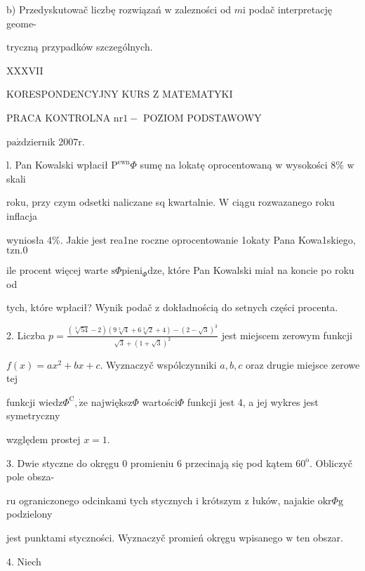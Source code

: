 \documentclass[a4paper,12pt]{article}
\begin{document}
b) Przedyskutowač liczbę rozwiązań $\mathrm{w}$ zalezności od $m\mathrm{i}$ podač interpretację geome-

tryczną przypadków szczególnych.







XXXVII

KORESPONDENCYJNY KURS Z MATEMATYKI

PRACA KONTROLNA $\mathrm{n}\mathrm{r}1-$ POZIOM PODSTAWOWY

$\mathrm{p}\mathrm{a}\acute{\mathrm{z}}$dziernik 2$007\mathrm{r}.$

l. Pan Kowalski wpłacił $\mathrm{P}^{\mathrm{e}\mathrm{w}\mathrm{n}}\Phi$ sumę na lokatę oprocentowaną $\mathrm{w}$ wysokości 8\% $\mathrm{w}$ skali

roku, przy czym odsetki naliczane sq kwartalnie. $\mathrm{W}$ ciągu rozwazanego roku inflacja

wyniosła 4\%. Jakie jest rea1ne roczne oprocentowanie 1okaty Pana Kowa1skiego, $\mathrm{t}\mathrm{z}\mathrm{n}. 0$

ile procent więcej warte $\mathrm{s}\Phi \mathrm{p}\mathrm{i}\mathrm{e}\mathrm{n}\mathrm{i}_{\Phi}\mathrm{d}\mathrm{z}\mathrm{e}$, które Pan Kowalski miał na koncie po roku od

tych, które wpłacił? Wynik podač $\mathrm{z}$ dokładnością do setnych części procenta.

2. Liczba $p=\displaystyle \frac{(\sqrt[3]{54}-2)(9\sqrt[3]{4}+6\sqrt[3]{2}+4)-(2-\sqrt{3})^{3}}{\sqrt{3}+(1+\sqrt{3})^{2}}$ jest miejscem zerowym funkcji

$f(x) = ax^{2}+bx+c$. Wyznaczyč wspólczynniki $a, b, c$ oraz drugie miejsce zerowe tej

funkcji $\mathrm{w}\mathrm{i}\mathrm{e}\mathrm{d}\mathrm{z}\Phi^{\mathrm{C}}, \dot{\mathrm{z}}\mathrm{e}$ największ$\Phi$ wartości$\Phi$ funkcji jest 4, a jej wykres jest symetryczny

względem prostej $x=1.$

3. Dwie styczne do okręgu $0$ promieniu 6 przecinają się pod kątem $60^{\mathrm{o}}$. Obliczyč pole obsza-

ru ograniczonego odcinkami tych stycznych $\mathrm{i}$ krótszym $\mathrm{z}$ łuków, najakie $\mathrm{o}\mathrm{k}\mathrm{r}\Phi \mathrm{g}$ podzielony

jest punktami styczności. Wyznaczyč promień okręgu wpisanego $\mathrm{w}$ ten obszar.

4. Niech
\end{document}
